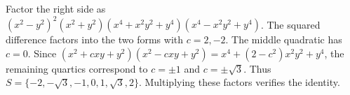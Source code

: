 Factor the right side as $(x^2-y^2)^2(x^2+y^2)(x^4+x^2y^2+y^4)(x^4-x^2y^2+y^4)$. The squared difference factors into the two forms with $ c=2,-2 $. The middle quadratic has $ c=0 $. Since $(x^2+cxy+y^2)(x^2-cxy+y^2)=x^4+(2-c^2)x^2y^2+y^4 $, the remaining quartics correspond to $ c=\pm1 $ and $ c=\pm\sqrt3 $. Thus $\boxed{S=\{-2,-\sqrt3,-1,0,1,\sqrt3,2\}}$. Multiplying these factors verifies the identity.
